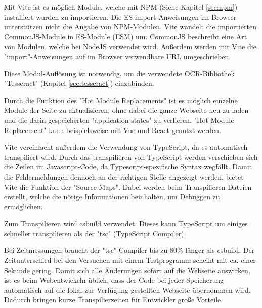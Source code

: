 

Mit Vite ist es möglich Module, welche mit NPM (Siehe Kapitel \ref{sec:npm}) installiert wurden zu importieren. 
Die ES import Anweisungen im Browser unterstützen nicht die Angabe von NPM-Modulen. Vite wandelt die importierten CommonJS-Module in ES-Module (ESM) um. CommonJS beschreibt eine Art von Modulen, welche bei NodeJS verwendet wird. Außerdem werden mit Vite die "import"-Anweisungen auf im Browser verwendbare URL umgeschrieben. \cite{ViteFeatures}


Diese Modul-Auflösung ist notwendig, um die verwendete OCR-Bibliothek "Tesseract" (Kapitel \ref{sec:tesseract}) einzubinden. 


Durch die Funktion des "Hot Module Replacements" ist es möglich einzelne Module der Seite zu aktualisieren, ohne dabei die ganze Webseite neu zu laden und die darin gespeicherten "application states" zu verlieren. "Hot Module Replacement" kann beispielsweise mit Vue und React genutzt werden. \cite{ViteFeatures}
  

Vite vereinfacht außerdem die Verwendung von TypeScript, da es automatisch transpiliert wird. 
Durch das transpilieren von TypeScript werden verschieben sich die Zeilen im Javascript-Code, da Typescript-spezifische Syntax wegfällt. 
Damit die Fehlermeldungen dennoch an der richtigen Stelle angezeigt werden, bietet Vite die Funktion der "Source Maps". 
Dabei werden beim Transpilieren Dateien erstellt, welche die nötige Informationen beinhalten, um Debuggen zu ermöglichen.

Zum Transpilieren wird esbuild\cite{esbuild} verwendet. Dieses kann TypeScript um einiges schneller transpilieren als der "tsc" (TypeScript Compiler). \cite{ViteFeatures}

Bei Zeitmessungen braucht der "tsc"-Compiler bis zu 80\% länger als esbuild. Der Zeitunterschied bei den Versuchen mit einem Testprogramm scheint mit ca. einer Sekunde gering. Damit sich alle Änderungen sofort auf die Webseite auswirken, ist es beim Webentwickeln üblich, dass der Code bei jeder Speicherung automatisch auf die lokal zur Verfügung gestellten Webseite übernommen wird. Dadurch bringen kurze Transpilierzeiten für Entwickler große Vorteile. 

